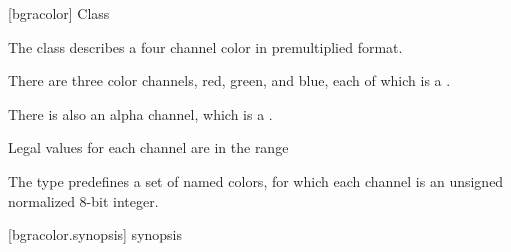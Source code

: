  [bgracolor] {Class }

\pnum
{}
The class  describes a four channel color in premultiplied format.

\pnum
There are three color channels, red, green, and blue, each of which is a .

\pnum
There is also an alpha channel, which is a .

\pnum
Legal values for each channel are in the range %

\pnum
The type predefines a set of named colors, for which each channel is an unsigned normalized 8-bit integer.

 [bgracolor.synopsis] { synopsis}

